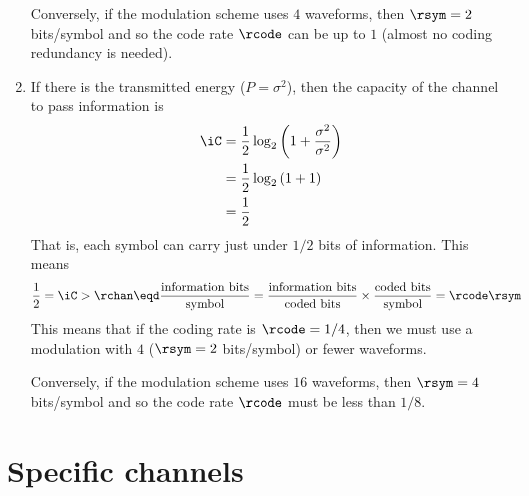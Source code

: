 \begin{example}
\begin{enumerate}
  Conversely, if the modulation scheme uses $4$ waveforms, then
  $\rsym=2$ bits/symbol and so the code rate $\rcode$ can be
  up to $1$ (almost no coding redundancy is needed).


  \item If there is the transmitted energy ($P=\sigma^2$),
        then the capacity of the channel to pass information is
    \begin{align*}
      \iC
        &= \frac{1}{2}\log_2\left( 1 + \frac{\sigma^2}{\sigma^2}\right)
      \\&= \frac{1}{2}\log_2\left( 1 + 1\right)
      \\&= \frac{1}{2}
    \end{align*}
  That is, each symbol can carry just under $1/2$ bits of information.
  This means
  \begin{align*}
    \frac{1}{2}
      &= \iC
       >  \rchan
       \eqd \frac{\mbox{information bits}}{\mbox{symbol}}
       = \frac{\mbox{information bits}}{\mbox{coded bits}} \times
         \frac{\mbox{coded bits}}{\mbox{symbol}}
       = \rcode \rsym
  \end{align*}
  This means that if the coding rate is $\rcode=1/4$,
  then we must use a modulation with $4$ ($\rsym=2$ bits/symbol)
  or fewer waveforms.

  Conversely, if the modulation scheme uses $16$ waveforms, then
  $\rsym=4$ bits/symbol and so the code rate $\rcode$ must be
  less than $1/8$.
\end{enumerate}
\end{example}




\section{Specific channels}
